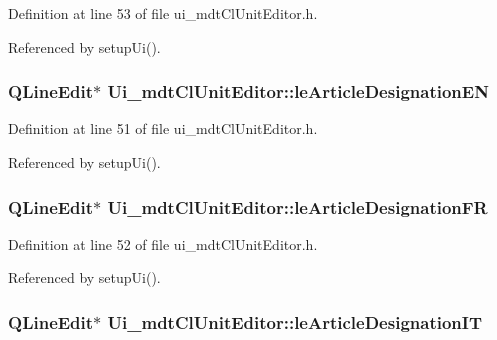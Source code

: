 Definition at line 53 of file ui\-\_\-mdt\-Cl\-Unit\-Editor.\-h.



Referenced by setup\-Ui().

\hypertarget{class_ui__mdt_cl_unit_editor_ad8ab648836f5fd3b2aa713ff4b253b73}{
\subsubsection[{le\-Article\-Designation\-E\-N}]{\setlength{\rightskip}{0pt plus 5cm}Q\-Line\-Edit$\ast$ Ui\-\_\-mdt\-Cl\-Unit\-Editor\-::le\-Article\-Designation\-E\-N}}\label{class_ui__mdt_cl_unit_editor_ad8ab648836f5fd3b2aa713ff4b253b73}


Definition at line 51 of file ui\-\_\-mdt\-Cl\-Unit\-Editor.\-h.



Referenced by setup\-Ui().

\hypertarget{class_ui__mdt_cl_unit_editor_ae247566a22c6c55356de4f4920f87a0e}{
\subsubsection[{le\-Article\-Designation\-F\-R}]{\setlength{\rightskip}{0pt plus 5cm}Q\-Line\-Edit$\ast$ Ui\-\_\-mdt\-Cl\-Unit\-Editor\-::le\-Article\-Designation\-F\-R}}\label{class_ui__mdt_cl_unit_editor_ae247566a22c6c55356de4f4920f87a0e}


Definition at line 52 of file ui\-\_\-mdt\-Cl\-Unit\-Editor.\-h.



Referenced by setup\-Ui().

\hypertarget{class_ui__mdt_cl_unit_editor_a231e4b45c5c6adcde8760ce345cf8b58}{
\subsubsection[{le\-Article\-Designation\-I\-T}]{\setlength{\rightskip}{0pt plus 5cm}Q\-Line\-Edit$\ast$ Ui\-\_\-mdt\-Cl\-Unit\-Editor\-::le\-Article\-Designation\-I\-T}}\label{class_ui__mdt_cl_unit_editor_a231e4b45c5c6adcde8760ce345cf8b58}


